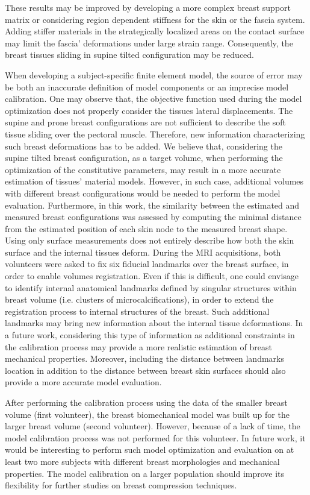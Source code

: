  These results may be improved by developing a more complex breast support matrix or considering region dependent stiffness for the skin or the fascia system. Adding stiffer materials in the strategically localized areas on the contact surface may limit the fascia' deformations under large strain range. Consequently, the breast tissues sliding in supine tilted configuration may be reduced.
 
When developing a subject-specific finite element model, the source of error may be both an inaccurate definition of model components or an imprecise model calibration. One may observe that, the objective function used during the model optimization does not properly consider the tissues lateral displacements. The supine and prone breast configurations are not sufficient to describe the soft tissue sliding over the pectoral muscle. Therefore, new information characterizing such breast deformations has to be added. We believe that, considering the supine tilted breast configuration, as a target volume, when performing the optimization of the constitutive parameters,  may result in a more accurate estimation of tissues' material models. However, in such case, additional volumes with different breast configurations would be needed to perform the model evaluation. Furthermore, in this work, the similarity between the estimated and measured breast configurations was assessed by computing the minimal distance from the estimated position of each skin node to the measured breast shape.  Using only surface measurements does not entirely describe how both the skin surface and the internal tissues deform. During the MRI acquisitions, both volunteers were asked to fix six fiducial landmarks over the breast surface, in order to enable volumes registration. Even if this is difficult, one could envisage to identify internal anatomical landmarks defined by singular structures within breast volume (i.e. clusters of microcalcifications), in order to extend the registration process to internal structures of the breast. Such additional landmarks may bring new information about the internal tissue deformations. In a future work, considering this type of information as additional constraints in the calibration process may provide a more realistic estimation of breast mechanical properties. Moreover, including the distance between landmarks location in addition to the distance between breast skin surfaces should also provide a more accurate model evaluation. 

After performing the calibration process using the data of the smaller breast volume (first volunteer), the breast biomechanical model was built up for the larger breast volume (second volunteer). However, because of a lack of time,  the model calibration process was not performed for this volunteer. In future work, it would be interesting to perform such model optimization and evaluation on at least two more subjects with different breast morphologies and mechanical properties. The model calibration on a larger population should improve its flexibility for further studies on breast compression techniques.

